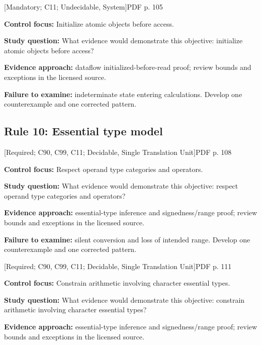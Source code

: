 \documentclass[10pt,letterpaper]{article}
\begin{document}
\smallskip
{}
 \textsf{\footnotesize [Mandatory; C11; Undecidable, System]}\hfill{\footnotesize PDF p. 105}\par
\textbf{Control focus:} Initialize atomic objects before access.\par
\textbf{Study question:} What evidence would demonstrate this objective: initialize atomic objects before access?\par
\textbf{Evidence approach:} dataflow initialized-before-read proof; review bounds and exceptions in the licensed source.\par
\textbf{Failure to examine:} indeterminate state entering calculations. Develop one counterexample and one corrected pattern.\par
\smallskip
\subsection{Rule 10: Essential type model}
 \textsf{\footnotesize [Required; C90, C99, C11; Decidable, Single Translation Unit]}\hfill{\footnotesize PDF p. 108}\par
\textbf{Control focus:} Respect operand type categories and operators.\par
\textbf{Study question:} What evidence would demonstrate this objective: respect operand type categories and operators?\par
\textbf{Evidence approach:} essential-type inference and signedness/range proof; review bounds and exceptions in the licensed source.\par
\textbf{Failure to examine:} silent conversion and loss of intended range. Develop one counterexample and one corrected pattern.\par
\smallskip
{}
 \textsf{\footnotesize [Required; C90, C99, C11; Decidable, Single Translation Unit]}\hfill{\footnotesize PDF p. 111}\par
\textbf{Control focus:} Constrain arithmetic involving character essential types.\par
\textbf{Study question:} What evidence would demonstrate this objective: constrain arithmetic involving character essential types?\par
\textbf{Evidence approach:} essential-type inference and signedness/range proof; review bounds and exceptions in the licensed source.\par
\end{document}
